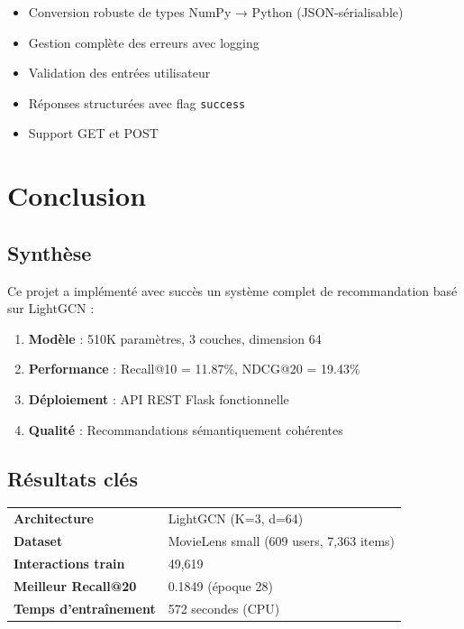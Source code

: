 \documentclass[12pt,a4paper]{report}
\begin{document}
\begin{itemize}
  \item Conversion robuste de types NumPy → Python (JSON-sérialisable)
  \item Gestion complète des erreurs avec logging
  \item Validation des entrées utilisateur
  \item Réponses structurées avec flag \texttt{success}
  \item Support GET et POST
\end{itemize}

\chapter{Conclusion}

\section{Synthèse}

Ce projet a implémenté avec succès un système complet de recommandation basé
sur LightGCN :

\begin{enumerate}
  \item \textbf{Modèle} : 510K paramètres, 3 couches, dimension 64
  \item \textbf{Performance} : Recall@10 = 11.87\%, NDCG@20 = 19.43\%
  \item \textbf{Déploiement} : API REST Flask fonctionnelle
  \item \textbf{Qualité} : Recommandations sémantiquement cohérentes
\end{enumerate}

\section{Résultats clés}

\begin{center}
\begin{tcolorbox}[colback=blue!5,colframe=Navy,arc=3pt,boxrule=1pt]
\begin{tabular}{ll}
  \textbf{Architecture} & LightGCN (K=3, d=64) \\
  \textbf{Dataset} & MovieLens small (609 users, 7,363 items) \\
  \textbf{Interactions train} & 49,619 \\
  \textbf{Meilleur Recall@20} & 0.1849 (époque 28) \\
  \textbf{Temps d'entraînement} & 572 secondes (CPU) \\
\end{tabular}
\end{tcolorbox}
\end{center}
\end{document}
